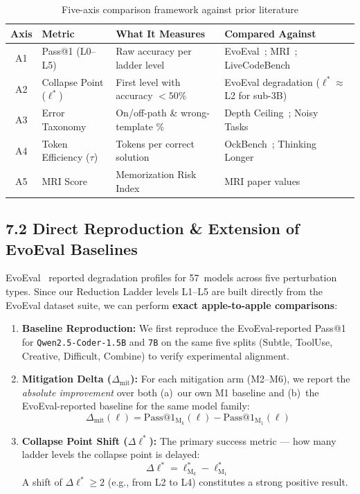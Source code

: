\documentclass[12pt, a4paper]{article}
\begin{document}
\begin{table}[ht!]
\centering
\caption{Five-axis comparison framework against prior literature}
\label{tab:comparison_axes}
\renewcommand{\arraystretch}{1.25}
{\small
\begin{tabularx}{\textwidth}{c l X X}
\toprule
\textbf{Axis} & \textbf{Metric} & \textbf{What It Measures} & \textbf{Compared Against} \\
\midrule
A1 & Pass@1 (L0--L5) & Raw accuracy per ladder level & EvoEval~\cite{evoeval}; MRI~\cite{memorize_or_generalize}; LiveCodeBench~\cite{livecodebench} \\
A2 & Collapse Point ($\ell^*$) & First level with accuracy ${<}50\%$ & EvoEval degradation ($\ell^*{\approx}$L2 for sub-3B) \\
A3 & Error Taxonomy & On/off-path \& wrong-template \% & Depth Ceiling~\cite{depth_ceiling}; Noisy Tasks~\cite{noisy_code_tasks} \\
A4 & Token Efficiency ($\tau$) & Tokens per correct solution & OckBench~\cite{ockbench}; Thinking Longer~\cite{thinking_longer} \\
A5 & MRI Score & Memorization Risk Index & MRI paper values~\cite{memorize_or_generalize} \\
\bottomrule
\end{tabularx}
}
\end{table}

\subsection{7.2 Direct Reproduction \& Extension of EvoEval Baselines}

EvoEval~\cite{evoeval} reported degradation profiles for 57~models across five perturbation types. Since our Reduction Ladder levels L1--L5 are built directly from the EvoEval dataset suite, we can perform \textbf{exact apple-to-apple comparisons}:

\begin{enumerate}[leftmargin=1.5em, itemsep=4pt]
  \item \textbf{Baseline Reproduction:} We first reproduce the EvoEval-reported Pass@1 for \texttt{Qwen2.5-Coder-1.5B} and \texttt{7B} on the same five splits (Subtle, ToolUse, Creative, Difficult, Combine) to verify experimental alignment.
  \item \textbf{Mitigation Delta ($\Delta_{\text{mit}}$):} For each mitigation arm (M2--M6), we report the \emph{absolute improvement} over both (a)~our own M1 baseline and (b)~the EvoEval-reported baseline for the same model family:
  \[
  \Delta_{\text{mit}}(\ell) = \text{Pass@1}_{\text{M}_k}(\ell) - \text{Pass@1}_{\text{M}_1}(\ell)
  \]
  \item \textbf{Collapse Point Shift ($\Delta \ell^*$):} The primary success metric --- how many ladder levels the collapse point is delayed:
  \[
  \Delta \ell^* = \ell^*_{\text{M}_k} - \ell^*_{\text{M}_1}
  \]
  A shift of $\Delta \ell^* \geq 2$ (e.g., from L2 to L4) constitutes a strong positive result.
\end{enumerate}
\end{document}
